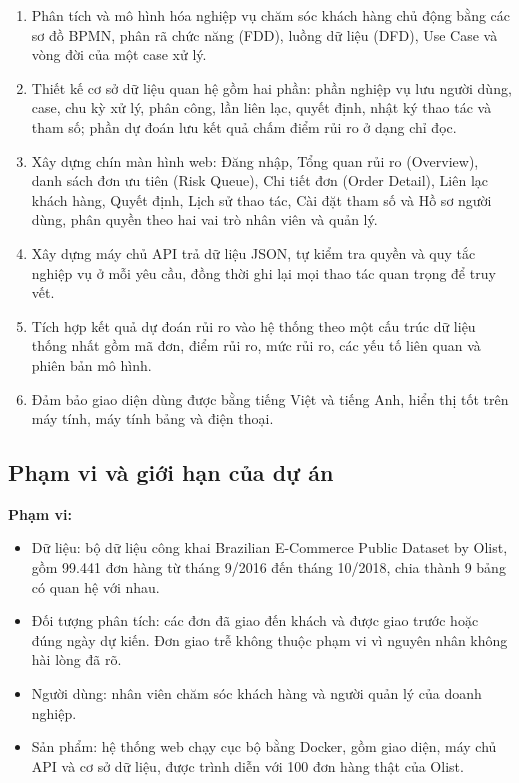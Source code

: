 \begin{enumerate}
    \item Phân tích và mô hình hóa nghiệp vụ chăm sóc khách hàng chủ động bằng các sơ đồ BPMN,
    phân rã chức năng (FDD), luồng dữ liệu (DFD), Use Case và vòng đời của một case xử lý.
    \item Thiết kế cơ sở dữ liệu quan hệ gồm hai phần: phần nghiệp vụ lưu người dùng, case, chu kỳ
    xử lý, phân công, lần liên lạc, quyết định, nhật ký thao tác và tham số; phần dự đoán lưu kết
    quả chấm điểm rủi ro ở dạng chỉ đọc.
    \item Xây dựng chín màn hình web: Đăng nhập, Tổng quan rủi ro (Overview), danh sách đơn ưu tiên
    (Risk Queue), Chi tiết đơn (Order Detail), Liên lạc khách hàng, Quyết định, Lịch sử thao tác,
    Cài đặt tham số và Hồ sơ người dùng, phân quyền theo hai vai trò nhân viên và quản lý.
    \item Xây dựng máy chủ API trả dữ liệu JSON, tự kiểm tra quyền và quy tắc nghiệp vụ ở mỗi yêu
    cầu, đồng thời ghi lại mọi thao tác quan trọng để truy vết.
    \item Tích hợp kết quả dự đoán rủi ro vào hệ thống theo một cấu trúc dữ liệu thống nhất gồm mã
    đơn, điểm rủi ro, mức rủi ro, các yếu tố liên quan và phiên bản mô hình.
    \item Đảm bảo giao diện dùng được bằng tiếng Việt và tiếng Anh, hiển thị tốt trên máy tính,
    máy tính bảng và điện thoại.
\end{enumerate}

\subsection{Phạm vi và giới hạn của dự án}

\textbf{Phạm vi:}

\begin{itemize}
    \item Dữ liệu: bộ dữ liệu công khai Brazilian E-Commerce Public Dataset by Olist, gồm
    99.441 đơn hàng từ tháng 9/2016 đến tháng 10/2018, chia thành 9 bảng có quan hệ với nhau.
    \item Đối tượng phân tích: các đơn đã giao đến khách và được giao trước hoặc đúng ngày dự
    kiến. Đơn giao trễ không thuộc phạm vi vì nguyên nhân không hài lòng đã rõ.
    \item Người dùng: nhân viên chăm sóc khách hàng và người quản lý của doanh nghiệp.
    \item Sản phẩm: hệ thống web chạy cục bộ bằng Docker, gồm giao diện, máy chủ API và cơ sở
    dữ liệu, được trình diễn với 100 đơn hàng thật của Olist.
\end{itemize}


